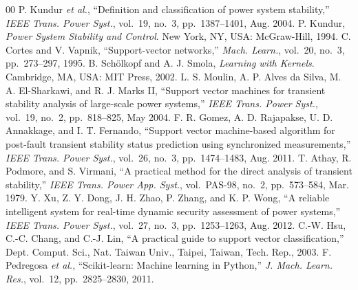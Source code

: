 \documentclass[conference]{IEEEtran}
\begin{document}
\begin{thebibliography}{00}
 P. Kundur \textit{et al.}, ``Definition and classification of power system
stability,'' \textit{IEEE Trans. Power Syst.}, vol.~19, no.~3, pp.~1387--1401, Aug. 2004.
 P. Kundur, \textit{Power System Stability and Control}. New York, NY, USA: McGraw-Hill, 1994.
 C. Cortes and V. Vapnik, ``Support-vector networks,'' \textit{Mach. Learn.}, vol.~20, no.~3,
pp.~273--297, 1995.
 B. Sch{\"o}lkopf and A. J. Smola, \textit{Learning with Kernels}. Cambridge, MA, USA: MIT
Press, 2002.
 L. S. Moulin, A. P. Alves da Silva, M. A. El-Sharkawi, and R. J. Marks II, ``Support vector
machines for transient stability analysis of large-scale power systems,'' \textit{IEEE Trans. Power Syst.}, vol.~19,
no.~2, pp.~818--825, May 2004.
 F. R. Gomez, A. D. Rajapakse, U. D. Annakkage, and I. T. Fernando, ``Support vector
machine-based algorithm for post-fault transient stability status prediction using synchronized measurements,''
\textit{IEEE Trans. Power Syst.}, vol.~26, no.~3, pp.~1474--1483, Aug. 2011.
 T. Athay, R. Podmore, and S. Virmani, ``A practical method for the direct analysis of transient
stability,'' \textit{IEEE Trans. Power App. Syst.}, vol.~PAS-98, no.~2, pp.~573--584, Mar. 1979.
 Y. Xu, Z. Y. Dong, J. H. Zhao, P. Zhang, and K. P. Wong, ``A reliable intelligent system for
real-time dynamic security assessment of power systems,'' \textit{IEEE Trans. Power Syst.}, vol.~27, no.~3,
pp.~1253--1263, Aug. 2012.
 C.-W. Hsu, C.-C. Chang, and C.-J. Lin, ``A practical guide to support vector classification,''
Dept. Comput. Sci., Nat. Taiwan Univ., Taipei, Taiwan, Tech. Rep., 2003.
 F. Pedregosa \textit{et al.}, ``Scikit-learn: Machine learning in Python,'' \textit{J. Mach.
Learn. Res.}, vol.~12, pp.~2825--2830, 2011.
\end{thebibliography}
\end{document}

